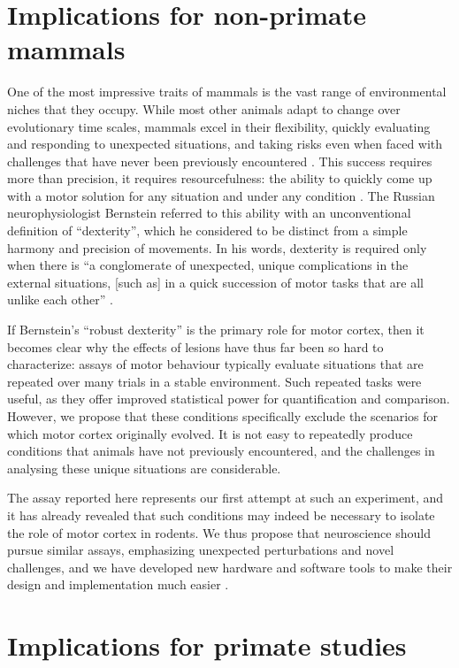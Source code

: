 \section{Implications for non-primate mammals}

One of the most impressive traits of mammals is the vast range of environmental niches that they occupy. While most other animals adapt to change over evolutionary time scales, mammals excel in their flexibility, quickly evaluating and responding to unexpected situations, and taking risks even when faced with challenges that have never been previously encountered \cite{Spinka2001}. This success requires more than precision, it requires resourcefulness: the ability to quickly come up with a motor solution for any situation and under any condition \cite{Bernstein1996}. The Russian neurophysiologist Bernstein referred to this ability with an unconventional definition of ``dexterity'', which he considered to be distinct from a simple harmony and precision of movements. In his words, dexterity is required only when there is \enquote{a conglomerate of unexpected, unique complications in the external situations, [such as] in a quick succession of motor tasks that are all unlike each other} \cite{Bernstein1996}.

If Bernstein’s ``robust dexterity'' is the primary role for motor cortex, then it becomes clear why the effects of lesions have thus far been so hard to characterize: assays of motor behaviour typically evaluate situations that are repeated over many trials in a stable environment. Such repeated tasks were useful, as they offer improved statistical power for quantification and comparison. However, we propose that these conditions specifically exclude the scenarios for which motor cortex originally evolved. It is not easy to repeatedly produce conditions that animals have not previously encountered, and the challenges in analysing these unique situations are considerable.

The assay reported here represents our first attempt at such an experiment, and it has already revealed that such conditions may indeed be necessary to isolate the role of motor cortex in rodents. We thus propose that neuroscience should pursue similar assays, emphasizing unexpected perturbations and novel challenges, and we have developed new hardware and software tools to make their design and implementation much easier \cite{Lopes2015a}.

\section{Implications for primate studies}


